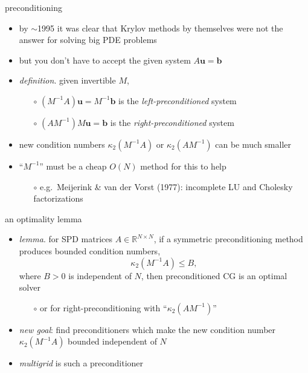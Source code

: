 \documentclass[hide notes,intlimits,usenames,dvipsnames]{beamer}
\newcommand{\RR}{\mathbb{R}}
\newcommand{\bb}{\mathbf{b}}
\newcommand{\bu}{\mathbf{u}}
\begin{document}
\begin{frame}{preconditioning}
\begin{itemize}
\item by $\sim$1995 it was clear that Krylov methods by themselves were not the answer for solving big PDE problems
\item but you don't have to accept the given system $A\bu=\bb$
\item \emph{definition}. given invertible $M$,
	\begin{itemize}
	\item[$\circ$] $(M^{-1}A)\bu=M^{-1}\bb$ is the \emph{left-preconditioned} system
	\item[$\circ$] $(AM^{-1})M\bu=\bb$ is the \emph{right-preconditioned} system
	\end{itemize}
\item new condition numbers $\kappa_2(M^{-1}A)$ or $\kappa_2(AM^{-1})$ can be much smaller
\item ``$M^{-1}$'' must be a cheap $O(N)$ method for this to help
	\begin{itemize}
	\item[$\circ$] e.g.~Meijerink \& van der Vorst (1977): incomplete LU and Cholesky factorizations
	\end{itemize}
\end{itemize}
\end{frame}


\begin{frame}{an optimality lemma}


\begin{itemize}
\item \emph{lemma}.  for SPD matrices $A\in\RR^{N\times N}$, if a symmetric preconditioning method produces bounded condition numbers,
     $$\kappa_2(M^{-1}A) \le B,$$
where $B>0$ is independent of $N$, then preconditioned CG is an optimal solver

    \medskip
	\begin{itemize}
	\item[$\circ$] or for right-preconditioning with ``$\kappa_2(AM^{-1})$''
	\end{itemize}

\vspace{5mm}
\item \emph{new goal}:  find preconditioners which make the new condition number $\kappa_2(M^{-1}A)$ bounded independent of $N$

\bigskip
\item \emph{multigrid} is such a preconditioner
\end{itemize}
\end{frame}
\end{document}
